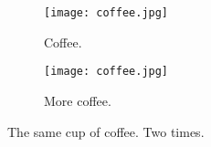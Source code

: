 \documentclass{article}
\begin{document}
	\begin{figure}[h!]
		\centering
		\begin{subfigure}[b]{0.4\linewidth}
			
		\texttt{[image: coffee.jpg]}\caption{Coffee.}
		\end{subfigure}
	
	\begin{subfigure}[b]{0.4\linewidth}
		\texttt{[image: coffee.jpg]}\caption{More coffee.}
	\end{subfigure}
	\caption{The same cup of coffee. Two times.}
	\label{fig:coffee}
	\end{figure}
\end{document}
